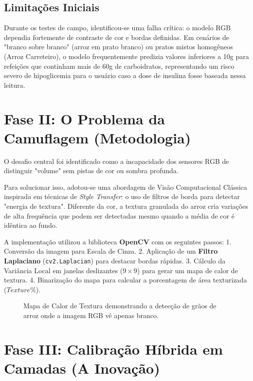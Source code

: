 \documentclass[a4paper,12pt]{article}
\begin{document}
\subsection{Limitações Iniciais}
Durante os testes de campo, identificou-se uma falha crítica: o modelo RGB dependia fortemente de contraste de cor e bordas definidas. Em cenários de "branco sobre branco" (arroz em prato branco) ou pratos mistos homogêneos (Arroz Carreteiro), o modelo frequentemente predizia valores inferiores a 10g para refeições que continham mais de 60g de carboidratos, representando um risco severo de hipoglicemia para o usuário caso a dose de insulina fosse baseada nessa leitura.

\section{Fase II: O Problema da Camuflagem (Metodologia)}

O desafio central foi identificado como a incapacidade dos sensores RGB de distinguir "volume" sem pistas de cor ou sombra profunda. 

Para solucionar isso, adotou-se uma abordagem de Visão Computacional Clássica inspirada em técnicas de \textit{Style Transfer}: o uso de filtros de borda para detectar "energia de textura". Diferente da cor, a textura granulada do arroz cria variações de alta frequência que podem ser detectadas mesmo quando a média de cor é idêntica ao fundo.

A implementação utilizou a biblioteca \textbf{OpenCV} com os seguintes passos:
1. Conversão da imagem para Escala de Cinza.
2. Aplicação de um \textbf{Filtro Laplaciano} (\texttt{cv2.Laplacian}) para destacar bordas rápidas.
3. Cálculo da Variância Local em janelas deslizantes ($9 \times 9$) para gerar um mapa de calor de textura.
4. Binarização do mapa para calcular a porcentagem de área texturizada ($Texture\%$).

\begin{figure}[h]
\centering
\caption{Mapa de Calor de Textura demonstrando a detecção de grãos de arroz onde a imagem RGB vê apenas branco.}
\end{figure}

\section{Fase III: Calibração Híbrida em Camadas (A Inovação)}
\end{document}
